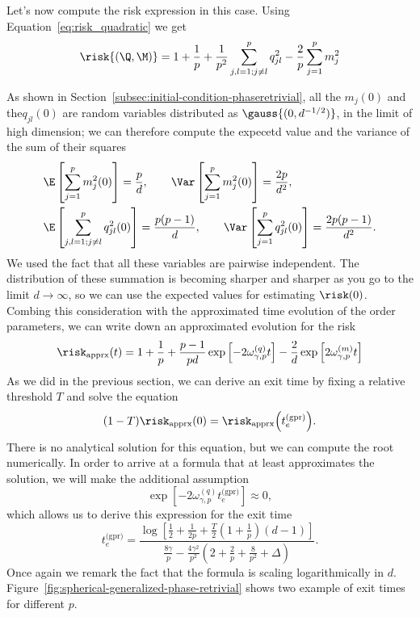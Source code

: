 Let's now compute the risk expression in this case. Using Equation~\eqref{eq:risk_quadratic} we get
\[
  \risk{(\Q,\M)} = 1 + \frac1p + \frac{1}{p^2}\sum_{j,l=1;j\neq l}^p q^2_{jl} - \frac2p \sum_{j=1}^p m^2_{j}
\]

As shown in Section~\ref{subsec:initial-condition-phaseretrivial}, all the \(m_j{(0)}\) and the\(q_{jl}{(0)}\) 
are random variables distributed as \(\gauss{(0,d^{-1/2})}\), in the limit of high dimension;
we can therefore compute the expecetd value and the variance of the sum of their squares
\[\begin{split}
 &\E\left[\sum_{j=1}^p m_j^2{(0)}\right] = \frac{p}{d}, \qquad
  \Var\left[\sum_{j=1}^p m_j^2{(0)}\right] = \frac{2p}{d^2}, \\
 &\E\left[\sum_{j,l=1;j\neq l}^p q_{jl}^2{(0)}\right] = \frac{p(p-1)}{d}, \qquad
  \Var\left[\sum_{j=1}^p q_{jl}^2{(0)}\right] = \frac{2p(p-1)}{d^2}. \\
\end{split}\]
We used the fact that all these variables are pairwise independent.
The distribution of these summation is becoming sharper and sharper as you go to the limit \(d\to\infty\),
so we can use the expected values for estimating \(\risk(0)\).
Combing this consideration with the approximated time evolution of the order parameters,
we can write down an approximated evolution for the risk
\[
  \risk_\text{apprx}{(t)} = 1 + \frac1p + \frac{p-1}{pd}\exp{\left[-2\omega^{(q)}_{\gamma,p} t\right]} - \frac2d \exp{\left[2\omega^{(m)}_{\gamma,p} t\right]}
\]
As we did in the previous section, we can derive an exit time by fixing a relative threshold \(T\)
and solve the equation 
\begin{equation}\label{eq:exit_time_equation}
  (1-T)\risk_\text{apprx}{(0)} = \risk_\text{apprx}{\left(t^\text{(gpr)}_e\right)}.
\end{equation}
There is no analytical solution for this equation, but we can compute the root numerically.
In order to arrive at a formula that at least approximates the solution, we will make the additional assumption 
\[
  \exp{\left[-2\omega^{(q)}_{\gamma,p} t^\text{(gpr)}_e\right]}  \approx 0,
\]
which allows us to derive this expression for the exit time
\[
  t^\text{(gpr)}_e = \frac{\log\left[\frac12+\frac{1}{2p}+\frac{T}{2}\left(1+\frac{1}{p}\right)(d-1)\right]}{\frac{8 \gamma}{p} -\frac{4 \gamma^2}{p^2} \left(2 +\frac{2}{p} + \frac{8}{p^2} + \Delta \right)}.
\]
Once again we remark the fact that the formula is scaling logarithmically in \(d\).
Figure~\ref{fig:spherical-generalized-phase-retrivial} shows two example of exit times for different \(p\).


